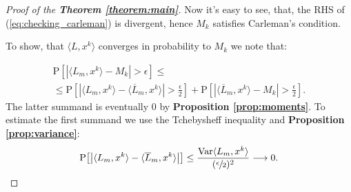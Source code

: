 \documentclass{article}
\newcommand{\prob}[1]{\mathrm{P}{\left[#1\right]}}
\newcommand{\Var}{\mathrm{Var}}
\begin{document}
\begin{proof}[Proof of the \textbf{Theorem \ref{theorem:main}}]
	Now it's easy to see, that, the RHS of (\ref{eq:checking_carleman}) is divergent, hence $M_k$ satisfies Carleman's condition. 
	
	To show, that $\langle L, x^k\rangle$ converges in probability to $M_k$ we note that:
	
	\begin{multline*}
		\prob{|\langle L_m, x^k \rangle - M_k| > \epsilon} \leq  \\ \leq	\prob{\left|\langle L_m, x^k \rangle - \langle\overline{L}_m, x^k\rangle\right| > \frac{\epsilon}{2}} + \prob{\left|\langle\overline{L}_m, x^k\rangle - M_k\right| > \frac{\epsilon}{2}}.
	\end{multline*}
	The latter summand is eventually $0$ by \textbf{Proposition \ref{prop:moments}}. To estimate the first summand we use the Tchebysheff inequality and \textbf{Proposition \ref{prop:variance}}:
	$$
		\prob{\left|\langle L_m, x^k \rangle - \langle\overline{L}_m, x^k\rangle\right|} \leq \frac{\Var{\langle L_m, x^k \rangle}}{(\sfrac{\epsilon}{2})^2} \longrightarrow 0.
	$$
\end{proof}




\end{document}

